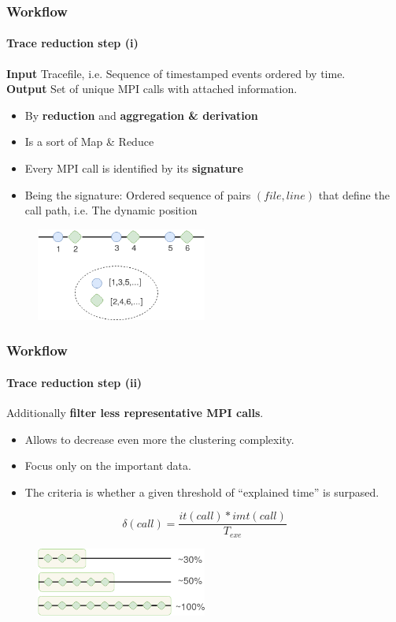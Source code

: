 \documentclass{beamer}
\begin{document}
\begin{frame}
\frametitle{Workflow}
\framesubtitle{Trace reduction step (i)}
\textbf{Input} Tracefile, i.e. Sequence of timestamped events ordered by time.\\
\textbf{Output} Set of unique MPI calls with attached information.
\vspace{10px}
\pause
\begin{itemize}
	\item By \textbf{reduction} and \textbf{aggregation \& derivation}
	\item Is a sort of Map \& Reduce
	\item Every MPI call is identified by its \textbf{signature}
	\item Being the signature: Ordered sequence of pairs $(file,line)$ that define the call path, i.e. The dynamic position
\end{itemize}
\pause
\begin{figure}
	\includegraphics[width=0.5\textwidth]{imgs/workflow_reduction.png}
\end{figure}
\end{frame}

\begin{frame}
\frametitle{Workflow}
\framesubtitle{Trace reduction step (ii)}
Additionally \textbf{filter less representative MPI calls}.
\begin{itemize}
	\item Allows to decrease even more the clustering complexity.
	\item Focus only on the important data.
	\item The criteria is whether a given threshold of ``explained time'' is surpased.
\end{itemize}
\begin{equation}
	\delta(call) = \frac{it(call)*imt(call)}{T_{exe}}
\end{equation}
\begin{figure}
	\includegraphics[width=0.5\textwidth]{imgs/workflow_reduction_2.png}
\end{figure}
\end{frame}
\end{document}
